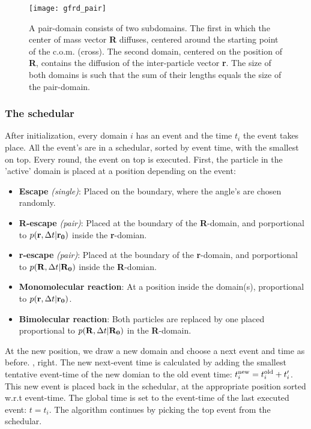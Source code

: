 \begin{figure}[th]
\centering
\texttt{[image: gfrd\_pair]}
\caption{ A pair-domain consists of two subdomains. The first in which the center of mass vector {\bf R} diffuses, centered around the starting point of the c.o.m. (cross). The second domain, centered on the position of {\bf R}, contains the diffusion of the inter-particle vector {\bf r}. The size of both domains is such that the sum of their lengths equals the size of the pair-domain. }
\end{figure}

\subsubsection{The schedular}
After initialization, every domain $i$ has an event and the time $t_i$ the event takes place. All the event's are in a schedular, sorted by event time, with the smallest on top. Every round, the event on top is executed. First, the particle in the 'active' domain is placed at a position depending on the event: 
\begin{itemize}
 \item {\bf Escape} {\it (single)}: Placed on the boundary, where the angle's are chosen randomly.
 \item {\bf R-escape} {\it (pair)}: Placed at the boundary of the {\bf R}-domain, and porportional to $p({\bf r},\Delta t|{\bf r_0})$ inside the {\bf r}-domian. 
 \item {\bf r-escape} {\it (pair)}: Placed at the boundary of the {\bf r}-domain, and porportional to $p({\bf R},\Delta t|{\bf R_0})$ inside the {\bf R}-domian. 
 \item {\bf Monomolecular reaction}: At a position inside the domain(s), proportional to $p({\bf r},\Delta t|{\bf r_0})$.
 \item {\bf Bimolecular reaction}: Both particles are replaced by one placed proportional to $p({\bf R},\Delta t|{\bf R_0})$ in the {\bf R}-domain.
 
\end{itemize}
At the new position, we draw a new domain and choose a next event and time as before. , right. The new next-event time is calculated by adding the smallest tentative event-time of the new domian to the old event time: $t^{\rm new}_i =  t^{\rm old}_i + t'_{i}$. This new event is placed back in the schedular, at the appropriate position sorted w.r.t event-time. The global time is set to the event-time of the last executed event: $t=t_i$. The algorithm continues by picking the top event from the schedular.


